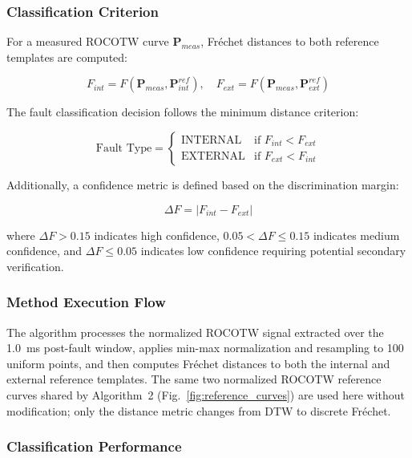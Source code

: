 \documentclass[journal]{IEEEtran}
\begin{document}
\subsubsection{Classification Criterion}

For a measured ROCOTW curve $\mathbf{P}_{meas}$, Fréchet distances to both reference templates are computed:

\begin{equation}
F_{int} = F(\mathbf{P}_{meas}, \mathbf{P}_{int}^{ref}), \quad F_{ext} = F(\mathbf{P}_{meas}, \mathbf{P}_{ext}^{ref})
\label{eq:frechet_distances}
\end{equation}

The fault classification decision follows the minimum distance criterion:

\begin{equation}
\text{Fault Type} = \begin{cases}
\text{INTERNAL} & \text{if } F_{int} < F_{ext} \\
\text{EXTERNAL} & \text{if } F_{ext} < F_{int}
\end{cases}
\label{eq:classification}
\end{equation}

Additionally, a confidence metric is defined based on the discrimination margin:

\begin{equation}
\Delta F = |F_{int} - F_{ext}|
\label{eq:margin}
\end{equation}

\noindent where $\Delta F > 0.15$ indicates high confidence, $0.05 < \Delta F \leq 0.15$ indicates medium confidence, and $\Delta F \leq 0.05$ indicates low confidence requiring potential secondary verification.

\subsubsection{Method Execution Flow}

The algorithm processes the normalized ROCOTW signal extracted over the 1.0~ms post-fault window, applies min-max normalization and resampling to 100 uniform points, and then computes Fréchet distances to both the internal and external reference templates. The same two normalized ROCOTW reference curves shared by Algorithm~2 (Fig.~\ref{fig:reference_curves}) are used here without modification; only the distance metric changes from DTW to discrete Fréchet.

\subsubsection{Classification Performance}
\end{document}
